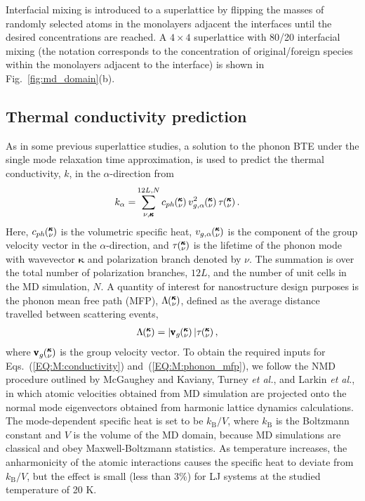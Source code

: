 \documentclass[aps,prb,preprint,preprintnumbers,amsmath,amssymb,floatfix,superscriptaddress]{revtex4}
\newcommand{\kv}{\mspace{-4.0mu}\left(\mspace{-8.0mu}
\begin{smallmatrix}&\pmb{\kappa} \\&\nu\end{smallmatrix}
\mspace{-3.0mu}\right)}
\begin{document}
Interfacial mixing is introduced to a superlattice by flipping the masses of randomly selected atoms in the monolayers adjacent the interfaces until the desired concentrations are reached.\cite{PhysRevB.79.075316} A $4\times4$ superlattice with 80/20 interfacial mixing (the notation corresponds to the concentration of original/foreign species within the monolayers adjacent to the interface) is shown in Fig.~\ref{fig:md_domain}(b).

\subsection{Thermal conductivity prediction}\label{SEC:methods}

As in some previous superlattice studies, \cite{Luckyanova16112012,doi:10.1021/nl202186y,savic:073113,PhysRevB.87.140302} a solution to the phonon BTE under the single mode relaxation time approximation,\cite{ziman_electrons_2001} is used to predict the thermal conductivity, $k$, in the $\alpha$-direction from
\begin{equation}\label{EQ:M:conductivity}
\begin{split}
k_{\mathbf{\alpha}}=&\sum_{\nu,\pmb{\kappa}}^{12L,N} c_{ph}\kv
v^{2}_{g,\mathbf{\alpha}}\kv \tau\kv.
\end{split}
\end{equation}
Here, $c_{ph}\kv$ is the volumetric specific heat, $v_{g,\mathbf{\alpha}}\kv$ is the component of the group velocity vector in the $\alpha$-direction, and $\tau\kv$ is the lifetime of the phonon mode with wavevector $\pmb{\kappa}$ and polarization branch denoted by $\nu$. The summation is over the total number of polarization branches, $12L$, and the number of unit cells in the MD simulation, $N$. A quantity of interest for nanostructure design purposes \cite{PhysRevB.87.035437} is the phonon mean free path (MFP), $\Lambda\kv$, defined as the average distance travelled between scattering events, \cite{ziman_electrons_2001}
\begin{equation}\label{EQ:M:phonon_mfp}
\begin{split}
\Lambda\kv &= |\pmb{\mathrm{v}}_{g}\kv | \tau\kv,
\end{split}
\end{equation}
where $\pmb{\mathrm{v}}_{g}\kv$ is the group velocity vector. To obtain the required inputs for Eqs.~(\ref{EQ:M:conductivity}) and~(\ref{EQ:M:phonon_mfp}), we follow the NMD procedure outlined by McGaughey and Kaviany,\cite{PhysRevB.69.094303} Turney \textit{et al.},\cite {PhysRevB.79.064301} and Larkin \textit{et al.},\cite{jason_inpress} in which atomic velocities obtained from MD simulation are projected onto the normal mode eigenvectors obtained from harmonic lattice dynamics calculations. The mode-dependent specific heat is set to be $k_\mathrm{B}/V$, where  $k_\mathrm{B}$ is the Boltzmann constant and $V$ is the volume of the MD domain, because MD simulations are classical and obey Maxwell-Boltzmann statistics. As temperature increases, the anharmonicity of the atomic interactions causes the specific heat to deviate from $k_\mathrm{B}/V$, but the effect is small (less than 3\%) for LJ systems at the studied temperature of 20 K.\cite{PhysRevB.69.094303} 
\end{document}
